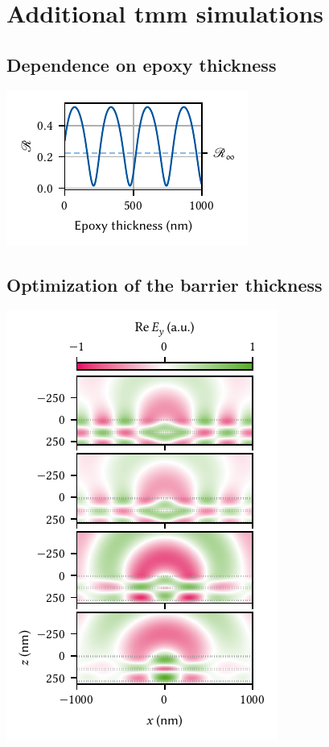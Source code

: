 \chapter{Additional \texorpdfstring{\acrshort{tmm}}{TMM} simulations}\label{ch:app:exp:tmm}
\section{Dependence on epoxy thickness}\label{sec:app:exp:tmm:epoxy}

\begin{marginfigure}
    \centering
    \includegraphics{img/pdf/experiment/reflectance_epoxy}
    \caption[]{}
    \label{fig:app:exp:tmm:epoxy}
\end{marginfigure}

\section{Optimization of the barrier thickness}\label{sec:app:exp:tmm:opt}
\begin{marginfigure}
    \centering
    \includegraphics{img/pdf/experiment/tmm_green_opt}
    \caption[]{}
    \label{fig:app:exp:tmm:green:opt}
\end{marginfigure}
